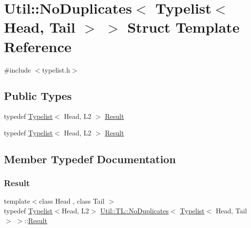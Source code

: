 \hypertarget{structUtil_1_1TL_1_1NoDuplicates_3_01Typelist_3_01Head_00_01Tail_01_4_01_4}{}\section{Util\+:\+:No\+Duplicates$<$ Typelist$<$ Head, Tail $>$ $>$ Struct Template Reference}
\label{structUtil_1_1TL_1_1NoDuplicates_3_01Typelist_3_01Head_00_01Tail_01_4_01_4}


{\ttfamily \#include $<$typelist.\+h$>$}

\subsection*{Public Types}
\begin{DoxyCompactItemize}
\item 
typedef \mbox{\hyperlink{structUtil_1_1Typelist}{Typelist}}$<$ Head, L2 $>$ \mbox{\hyperlink{structUtil_1_1TL_1_1NoDuplicates_3_01Typelist_3_01Head_00_01Tail_01_4_01_4_ada564784f87c4684be2e13c5e1bf722e}{Result}}
\item 
typedef \mbox{\hyperlink{structUtil_1_1Typelist}{Typelist}}$<$ Head, L2 $>$ \mbox{\hyperlink{structUtil_1_1TL_1_1NoDuplicates_3_01Typelist_3_01Head_00_01Tail_01_4_01_4_ada564784f87c4684be2e13c5e1bf722e}{Result}}
\end{DoxyCompactItemize}


\subsection{Member Typedef Documentation}
\mbox{\label{structUtil_1_1TL_1_1NoDuplicates_3_01Typelist_3_01Head_00_01Tail_01_4_01_4_ada564784f87c4684be2e13c5e1bf722e}} 
\subsubsection{\texorpdfstring{Result}{Result}\hspace{0.1cm}{\footnotesize\ttfamily [1/2]}}
{\footnotesize\ttfamily template$<$class Head , class Tail $>$ \\
typedef \mbox{\hyperlink{structUtil_1_1Typelist}{Typelist}}$<$Head, L2$>$ \mbox{\hyperlink{structUtil_1_1TL_1_1NoDuplicates}{Util\+::\+T\+L\+::\+No\+Duplicates}}$<$ \mbox{\hyperlink{structUtil_1_1Typelist}{Typelist}}$<$ Head, Tail $>$ $>$\+::\mbox{\hyperlink{structUtil_1_1TL_1_1NoDuplicates_3_01Typelist_3_01Head_00_01Tail_01_4_01_4_ada564784f87c4684be2e13c5e1bf722e}{Result}}}


